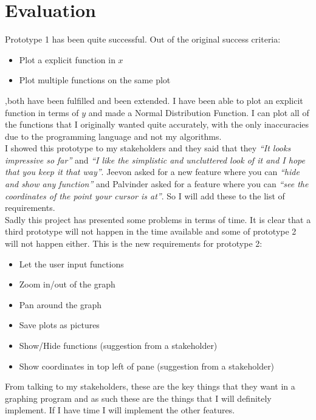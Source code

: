 \documentclass[../../../main.tex]{subfiles}
\begin{document}
\chapter{Evaluation}
Prototype 1 has been quite successful. Out of the original success criteria:
\begin{itemize}
	\item Plot a explicit function in $x$
	\item Plot multiple functions on the same plot
\end{itemize}
,both have been fulfilled and been extended. I have been able to plot an explicit function in terms of $y$ and made a Normal Distribution Function. I can plot all of the functions that I originally wanted quite accurately, with the only inaccuracies due to the programming language and not my algorithms.\\
I showed this prototype to my stakeholders and they said that they \textit{``It looks impressive so far''} and \textit{``I like the simplistic and uncluttered look of it and I hope that you keep it that way''}. Jeevon asked for a new feature where you can \textit{``hide and show any function''} and Palvinder asked for a feature where you can \textit{``see the coordinates of the point your cursor is at''}. So I will add these to the list of requirements.
\\
Sadly this project has presented some problems in terms of time. It is clear that a third prototype will not happen in the time available and some of prototype 2 will not happen either. This is the new requirements for prototype 2:
\begin{itemize}
	\item Let the user input functions
	\item Zoom in/out of the graph
	\item Pan around the graph
	\item Save plots as pictures
	\item Show/Hide functions (suggestion from a stakeholder)
	\item Show coordinates in top left of pane (suggestion from a stakeholder)
\end{itemize}
From talking to my stakeholders, these are the key things that they want in a graphing program and as such these are the things that I will definitely implement. If I have time I will implement the other features.
\newpage
\end{document}
